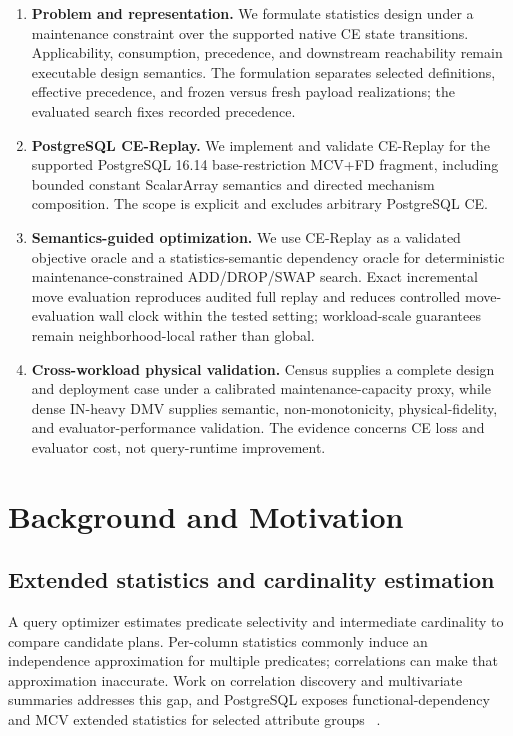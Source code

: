 \documentclass[sigconf,nonacm]{acmart}
\begin{document}
\begin{enumerate}
\item \textbf{Problem and representation.} We formulate statistics design under a maintenance constraint over the supported native CE state transitions. Applicability, consumption, precedence, and downstream reachability remain executable design semantics. The formulation separates selected definitions, effective precedence, and frozen versus fresh payload realizations; the evaluated search fixes recorded precedence.
\item \textbf{PostgreSQL CE-Replay.} We implement and validate CE-Replay for the supported PostgreSQL 16.14 base-restriction MCV+FD fragment, including bounded constant ScalarArray semantics and directed mechanism composition. The scope is explicit and excludes arbitrary PostgreSQL CE.
\item \textbf{Semantics-guided optimization.} We use CE-Replay as a validated objective oracle and a statistics-semantic dependency oracle for deterministic maintenance-constrained ADD/DROP/SWAP search. Exact incremental move evaluation reproduces audited full replay and reduces controlled move-evaluation wall clock within the tested setting; workload-scale guarantees remain neighborhood-local rather than global.
\item \textbf{Cross-workload physical validation.} Census supplies a complete design and deployment case under a calibrated maintenance-capacity proxy, while dense IN-heavy DMV supplies semantic, non-monotonicity, physical-fidelity, and evaluator-performance validation. The evidence concerns CE loss and evaluator cost, not query-runtime improvement.
\end{enumerate}
\section{Background and Motivation}\label{sec:2}

\subsection{Extended statistics and cardinality estimation}

A query optimizer estimates predicate selectivity and intermediate cardinality to compare candidate plans. Per-column statistics commonly induce an independence approximation for multiple predicates; correlations can make that approximation inaccurate. Work on correlation discovery and multivariate summaries addresses this gap, and PostgreSQL exposes functional-dependency and MCV extended statistics for selected attribute groups ~\cite{ilyas2004cords,postgresql16docs}.
\end{document}
